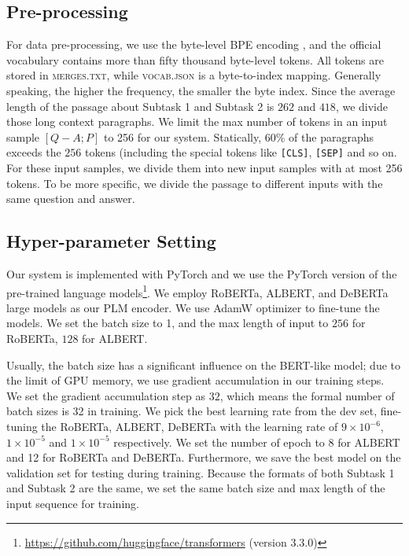 \documentclass[11pt,a4paper]{article}
\begin{document}
\subsection{Pre-processing}
For data pre-processing, we use the byte-level BPE encoding \cite{noauthor_150807909_nodate}, and the official vocabulary contains more than fifty thousand byte-level tokens. 
All tokens are stored in \textsc{merges.txt}, while \textsc{vocab.json} is a byte-to-index mapping. 
Generally speaking, the higher the frequency, the smaller the byte index.
Since the average length of the passage about Subtask 1 and Subtask 2 is $262$ and $418$, we divide those long context paragraphs.
We limit the max number of tokens in an input sample $[Q-A;P]$ to 256 for our system.
Statically, 60\% of the paragraphs exceeds the $256$ tokens (including the special tokens like \texttt{[CLS]}, \texttt{[SEP]} and so on. 
For these input samples, we divide them into new input samples with at most 256 tokens. 
To be more specific, we divide the passage to different inputs with the same question and answer.

\subsection{Hyper-parameter Setting}
Our system is implemented with PyTorch \cite{pytorch} and we use the PyTorch  version of the pre-trained language models\footnote{\url{https://github.com/huggingface/transformers} (version 3.3.0)}. 
We employ RoBERTa, ALBERT, and DeBERTa large models as our PLM encoder. 
We use AdamW optimizer \cite{loshchilov_fixing_2018} to fine-tune the models.
We set the batch size to 1,  and the max length of input to $256$ for RoBERTa, $128$ for ALBERT.

Usually, the batch size has a significant influence on the BERT-like model; due to the limit of GPU memory, we use gradient accumulation in our training steps.
We set the gradient accumulation step as $32$, which means the formal number of batch sizes is 32 in training.
We pick the best learning rate from the dev set, fine-tuning the RoBERTa, ALBERT, DeBERTa with the learning rate of $9 \times 10^{-6}$, $1 \times 10^{-5}$ and $1 \times 10^{-5}$ respectively.
We set the number of epoch to 8 for ALBERT and 12 for RoBERTa and DeBERTa.
Furthermore, we save the best model on the validation set for testing during training.
Because the formats of both Subtask 1 and Subtask 2 are the same, we set the same batch size and max length of the input sequence for training. 
\end{document}
